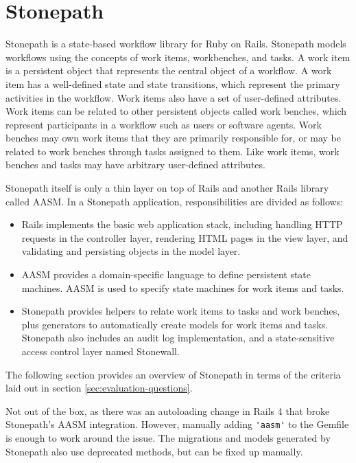 \documentclass[document.tex]{subfiles}
\begin{document}
\section {Stonepath}

Stonepath is a state-based workflow library for Ruby on Rails. Stonepath models workflows using the concepts of work items, workbenches, and tasks. A work item is a persistent object that represents the central object of a workflow. A work item has a well-defined state and state transitions, which represent the primary activities in the workflow. Work items also have a set of user-defined attributes. Work items can be related to other persistent objects called work benches, which represent participants in a workflow such as users or software agents. Work benches may own work items that they are primarily responsible for, or may be related to work benches through tasks assigned to them. Like work items, work benches and tasks may have arbitrary user-defined attributes.

Stonepath itself is only a thin layer on top of Rails and another Rails library called AASM. In a Stonepath application, responsibilities are divided as follows:

\begin{itemize}
\item Rails implements the basic web application stack, including handling HTTP requests in the controller layer, rendering HTML pages in the view layer, and validating and persisting objects in the model layer.
\item AASM provides a domain-specific language to define persistent state machines. AASM is used to specify state machines for work items and tasks.
\item Stonepath provides helpers to relate work items to tasks and work benches, plus generators to automatically create models for work items and tasks. Stonepath also includes an audit log implementation, and a state-sensitive access control layer named Stonewall.
\end{itemize}

The following section provides an overview of Stonepath in terms of the criteria laid out in section \ref{sec:evaluation-questions}.



Not out of the box, as there was an autoloading change in Rails 4 that broke Stonepath's AASM integration. However, manually adding \verb!'aasm'! to the Gemfile is enough to work around the issue. The migrations and models generated by Stonepath also use deprecated methods, but can be fixed up manually.
\end{document}
